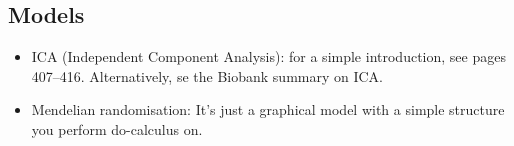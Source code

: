 \documentclass{article}
\begin{document}
\subsection{Models\label{models}}
\begin{itemize}
\item ICA (Independent Component Analysis): for a simple introduction, see \cite{Murphy2012} pages 407--416. Alternatively, se the Biobank summary on ICA.
\item Mendelian randomisation: It's just a graphical model with a simple structure you perform do-calculus on.
\end{itemize}



\end{document}
